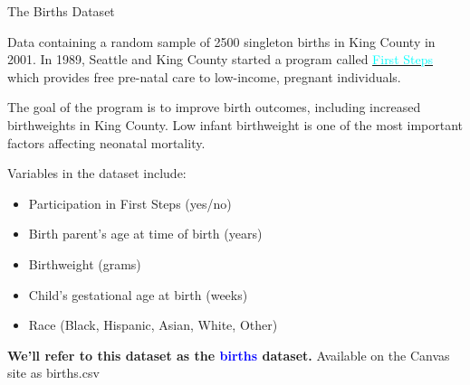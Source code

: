 \documentclass[10pt,t]{beamer}
\begin{document}
\begin{frame}{The Births Dataset}
	\vspace{-5 mm}
	
	Data containing a random sample of 2500 singleton births in King County in 2001. In 1989, Seattle and King County started a program called \href{https://kingcounty.gov/depts/health/child-teen-health/maternity-support-infant-case-management.aspx}{\textcolor{cyan}{First Steps}} which provides free pre-natal care to low-income, pregnant individuals. 
	
	\medskip
	The goal of the program is to improve birth outcomes, including increased birthweights in King County. Low infant birthweight is one of the most important factors affecting neonatal mortality. 

\medskip

Variables in the dataset include:

\medskip
\begin{itemize}
	\item Participation in First Steps (yes/no)
	\item Birth parent's age at time of birth (years)
	\item Birthweight (grams)
	\item Child's gestational age at birth (weeks)
	\item Race (Black, Hispanic, Asian, White, Other)
\end{itemize}

\vspace{0.3cm} 

\textbf{We'll refer to this dataset as the \textcolor{blue}{births} dataset.} Available on the Canvas site as \color{blue} births.csv
\end{frame}
\end{document}
